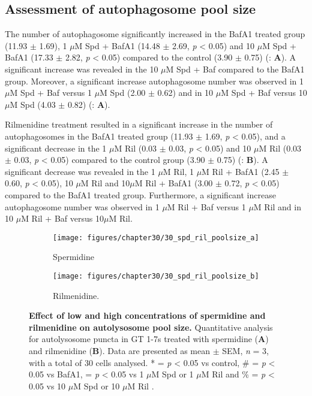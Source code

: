 {\subsection{Assessment of autophagosome pool size}
The number of autophagosome significantly increased in the BafA1 treated group (11.93  $\pm$ 1.69), 1 $\mu$M Spd + BafA1 (14.48 $\pm$ 2.69, \textit{p} < 0.05) and 10 $\mu$M Spd + BafA1 (17.33 $\pm$ 2.82, \textit{p} < 0.05) compared to the control (3.90 $\pm$ 0.75) (: \textbf{A}). A significant increase was revealed in the 10 $\mu$M Spd + Baf compared to the BafA1 group. Moreover, a significant increase autophagosome number was observed in 1 $\mu$M Spd + Baf versus 1 $\mu$M Spd (2.00 $\pm$ 0.62) and in 10 $\mu$M Spd + Baf versus 10 $\mu$M Spd (4.03 $\pm$ 0.82) (: \textbf{A}).

Rilmenidine treatment resulted in a significant increase in the number of autophagosomes in the BafA1 treated group (11.93 $\pm$ 1.69, \textit{p} < 0.05), and a significant decrease in the 1 $\mu$M Ril (0.03 $\pm$ 0.03, \textit{p} < 0.05) and 10 $\mu$M Ril (0.03 $\pm$ 0.03, \textit{p} < 0.05) compared to the control group (3.90 $\pm$ 0.75) (: \textbf{B}). A significant decrease was revealed in the 1 $\mu$M Ril, 1 $\mu$M Ril + BafA1 (2.45 $\pm$ 0.60, \textit{p} < 0.05), 10 $\mu$M Ril and 10$\mu$M Ril + BafA1 (3.00 $\pm$ 0.72, \textit{p} < 0.05) compared to the BafA1 treated group. Furthermore, a significant increase autophagosome number was observed in 1 $\mu$M Ril + Baf versus 1 $\mu$M Ril and in 10 $\mu$M Ril + Baf versus 10$\mu$M Ril.

\begin{figure}[!htbp]
  \begin{subfigure}[b]{0.495\linewidth}
    \texttt{[image: figures/chapter30/30\_spd\_ril\_poolsize\_a]}
    \caption{Spermidine}
  \end{subfigure}
  \begin{subfigure}[b]{0.495\linewidth}
    \texttt{[image: figures/chapter30/30\_spd\_ril\_poolsize\_b]}
    \caption{Rilmenidine.}
  \end{subfigure}
  \caption[Effect of low and high concentrations of spermidine and rilmenidine on autolysosome pool size]{\textbf{Effect of low and high concentrations of spermidine and rilmenidine on autolysosome pool size.} Quantitative analysis for autolysosome puncta in GT 1-7s treated with spermidine (\textbf{A}) and rilmenidine (\textbf{B}). Data are presented as mean $\pm$ SEM, \textit{n} = 3, with a total of 30 cells analysed. * = \textit{p} < 0.05 vs control, \# = \textit{p} < 0.05 vs BafA1, \@ = \textit{p} < 0.05 vs 1 $\mu$M Spd or 1 $\mu$M Ril and \% = \textit{p} < 0.05 vs 10 $\mu$M Spd or 10 $\mu$M Ril .}
  \label{fig:30_spd_ril_poolsize1}
\end{figure}

}
